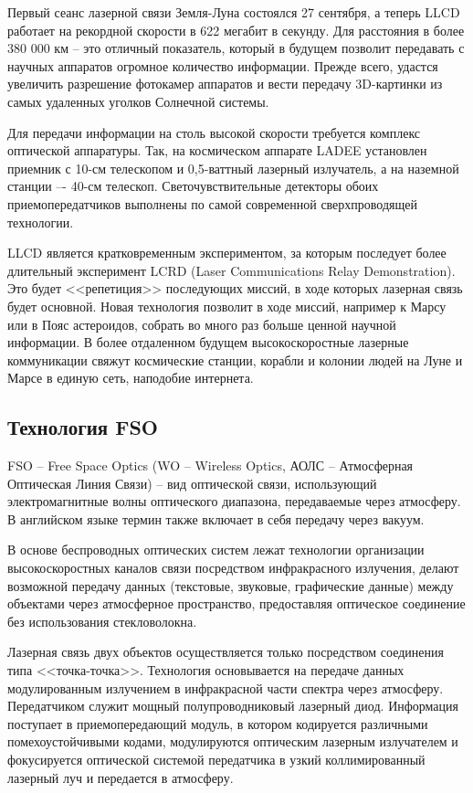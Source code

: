 \documentclass[14pt,pscyr,titlepage]{hedreport}
\begin{document}
		Первый сеанс лазерной связи Земля-Луна состоялся 27 сентября, а 
		теперь LLCD работает на рекордной скорости в 622 мегабит в секунду. 
		Для расстояния в более 380 000 км – это отличный показатель, который 
		в будущем позволит передавать с научных аппаратов огромное количество 
		информации. Прежде всего, удастся увеличить разрешение фотокамер 
		аппаратов и вести передачу 3D-картинки из самых удаленных уголков 
		Солнечной системы.

		Для передачи информации на столь высокой скорости требуется комплекс 
		оптической аппаратуры. Так, на космическом аппарате LADEE установлен 
		приемник с 10-см телескопом и 0,5-ваттный лазерный излучатель, а на 
		наземной станции –- 40-см телескоп. Светочувствительные детекторы 
		обоих приемопередатчиков выполнены по самой современной 
		сверхпроводящей технологии.

		LLCD является кратковременным экспериментом, за которым последует 
		более длительный эксперимент LCRD (Laser Communications Relay 
		Demonstration). Это будет <<репетиция>> последующих 
		миссий, в ходе которых лазерная связь будет основной. Новая технология 
		позволит в ходе миссий, например к Марсу или в Пояс астероидов, 
		собрать во много раз больше ценной научной информации. В более 
		отдаленном будущем высокоскоростные лазерные коммуникации свяжут 
		космические станции, корабли и колонии людей на Луне и Марсе в 
		единую сеть, наподобие интернета.

	\subsection{Технология FSO}
		FSO -- Free Space Optics (WO -- Wireless Optics, АОЛС -- Атмосферная 
		Оптическая Линия Связи) -- вид оптической связи, использующий 
		электромагнитные волны оптического диапазона, передаваемые через 
		атмосферу. В английском языке термин также включает в себя передачу 
		через вакуум.

		В основе беспроводных оптических систем лежат технологии организации 
		высокоскоростных каналов связи посредством инфракрасного излучения, 
		делают возможной передачу данных (текстовые, звуковые, графические 
		данные) между объектами через атмосферное пространство, предоставляя 
		оптическое соединение без использования стекловолокна.

		Лазерная связь двух объектов осуществляется только посредством 
		соединения типа <<точка-точка>>. Технология основывается на передаче 
		данных модулированным излучением в инфракрасной части спектра через 
		атмосферу. Передатчиком служит мощный полупроводниковый лазерный диод. 
		Информация поступает в приемопередающий модуль, в котором кодируется 
		различными помехоустойчивыми кодами, модулируются оптическим лазерным 
		излучателем и фокусируется оптической системой передатчика в узкий 
		коллимированный лазерный луч и передается в атмосферу.
\end{document}
